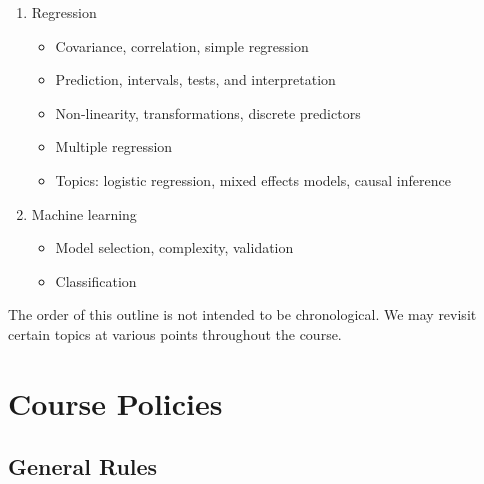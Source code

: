 \documentclass[11pt]{article}
\begin{document}
\begin{enumerate}
\item Regression

  \begin{itemize}
  \item Covariance, correlation, simple regression
  \item Prediction, intervals, tests, and interpretation
  \item Non-linearity, transformations, discrete predictors
  \item Multiple regression
  \item Topics: logistic regression, mixed effects models, causal inference
  \end{itemize}

\item Machine learning

  \begin{itemize}
  \item Model selection, complexity, validation
  \item Classification
  \end{itemize}
  
\end{enumerate}

The order of this outline is not intended to be chronological. We may revisit certain topics at various points throughout the course.


\section*{Course Policies}

\subsection*{General Rules}
\end{document}
